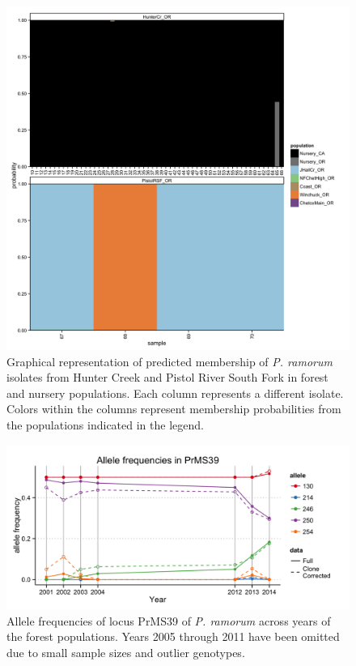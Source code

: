 \documentclass[double,11pt]{beavtex}
\begin{document}
  \begin{figure}
  
  {\centering \includegraphics[width=0.8\linewidth]{figure/phytopathology/figureS8} 
  
  }
  
  \caption[Graphical representation of predicted membership of \emph{P. ramorum}
  isolates from Hunter Creek and Pistol River South Fork in forest and
  nursery populations.]{Graphical representation of predicted membership of \emph{P. ramorum}
  isolates from Hunter Creek and Pistol River South Fork in forest and
  nursery populations. Each column represents a different isolate. Colors
  within the columns represent membership probabilities from the
  populations indicated in the legend.}\label{fig:ramS8}
  \end{figure}
  
  \begin{figure}
  
  {\centering \includegraphics[width=0.8\linewidth]{figure/phytopathology/figureS9} 
  
  }
  
  \caption[Allele frequencies of locus PrMS39 of \emph{P. ramorum} across years of
  the forest populations.]{Allele frequencies of locus PrMS39 of \emph{P. ramorum} across years of
  the forest populations. Years 2005 through 2011 have been omitted due to
  small sample sizes and outlier genotypes.}\label{fig:ramS9}
  \end{figure}
  
\end{document}
